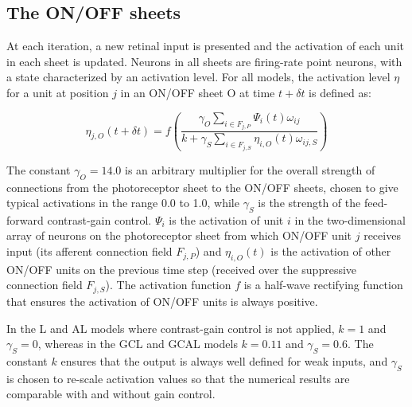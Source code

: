 \documentclass{article}
\begin{document}
\subsection*{The ON/OFF sheets}

At each iteration, a new retinal input is presented and the activation
of each unit in each sheet is updated. Neurons in all sheets are
firing-rate point neurons, with a state characterized by an activation
level.  For all models, the activation level $\eta$ for a unit at
position $j$ in an ON/OFF sheet O at time $t+\delta t$ is defined as:

\begin{equation}
\eta_{j, O}(t+\delta t)=f\left(\frac{\gamma_{O}\sum_{i\in F_{j,P}}\Psi_{i}(t)\omega_{ij}}{k+\gamma_{S}\sum_{i\in F_{j,S}}\eta_{i, O}(t)\omega_{ij, S}}\right)
\label{eqn:lgnactivation}
\end{equation}

The constant $\gamma_{O}=14.0$ is an arbitrary multiplier for the
overall strength of connections from the photoreceptor sheet to the
ON/OFF sheets, chosen to give typical activations in the range 0.0 to
1.0, while $\gamma_{S}$ is the strength of the feed-forward
contrast-gain control. $\Psi_{i}$ is the activation of unit $i$ in the
two-dimensional array of neurons on the photoreceptor sheet from which
ON/OFF unit $j$ receives input (its afferent connection field
$F_{j,P}$) and $\eta_{i, O}(t)$ is the activation of other ON/OFF units on
the previous time step (received over the suppressive connection field
$F_{j,S}$). The activation function $f$ is a half-wave rectifying
function that ensures the activation of ON/OFF units is always positive.

In the L and AL models where contrast-gain control is not applied,
$k=1$ and $\gamma_{S}=0$, whereas in the GCL and GCAL models $k=0.11$
and $\gamma_{S}=0.6$.  The constant $k$ ensures that the output is
always well defined for weak inputs, and $\gamma_{S}$ is chosen to
re-scale activation values so that the numerical results are
comparable with and without gain control.
\end{document}
